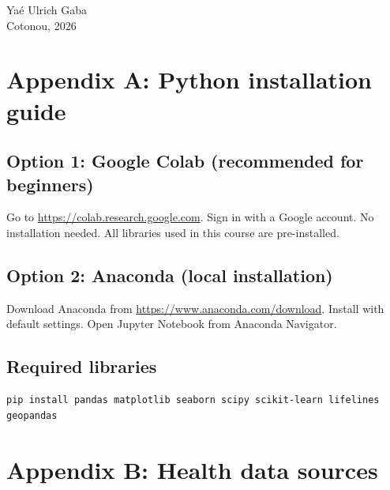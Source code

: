 \documentclass[12pt,a4paper,twoside]{book}
\begin{document}
\vfill
\noindent Yaé Ulrich Gaba\\
Cotonou, 2026

\mainmatter












\backmatter

\chapter*{Appendix A: Python installation guide}

\section*{Option 1: Google Colab (recommended for beginners)}
Go to \url{https://colab.research.google.com}. Sign in with a Google account. No installation needed. All libraries used in this course are pre-installed.

\section*{Option 2: Anaconda (local installation)}
Download Anaconda from \url{https://www.anaconda.com/download}. Install with default settings. Open Jupyter Notebook from Anaconda Navigator.

\section*{Required libraries}
\begin{verbatim}
pip install pandas matplotlib seaborn scipy scikit-learn lifelines geopandas
\end{verbatim}

\chapter*{Appendix B: Health data sources}
\end{document}

